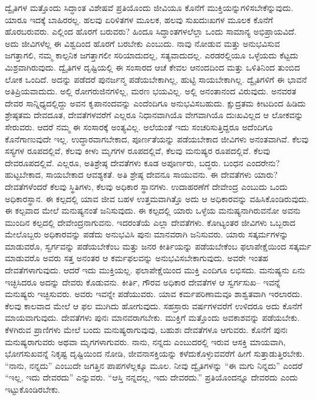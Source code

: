 ದ್ವೈತಿಗಳ ಮತ್ತೊಂದು ಸಿದ್ಧಾಂತ ವಿಶೇಷವೆ ಪ್ರತಿಯೊಂದು ಜೀವಿಯೂ ಕೊನೆಗೆ ಮುಕ್ತಿಯನ್ನುಗಳಿಸಬೇಕೆನ್ನುವುದು. ಯಾರೂ ಇದಕ್ಕೆ ಬಾಹಿರರಲ್ಲ. ಹಲವು ಏರಿಳಿತಗಳ ಮೂಲಕ, ಹಲವು ಸುಖದುಃಖಗಳ ಮೂಲಕ ಕೊನೆಗೆ ಹೊರಬರುವರು. ಎಲ್ಲಿಂದ ಹೊರಗೆ ಬರುವರು? ಹಿಂದೂ ಸಿದ್ಧಾಂತಗಳಲೆಲ್ಲಾ ಒಂದು ಸಾಮಾನ್ಯ ಅಭಿಪ್ರಾಯವಿದೆ. ಅದು ಜೀವಿಗಳೆಲ್ಲ ಈ ವಿಶ್ವದಿಂದ ಹೊರಗೆ ಬರಬೇಕು ಎಂಬುದು. ನಾವು ನೋಡುವ ಮತ್ತು ಅನುಭವಿಸುವ ಜಗತ್ತಾಗಲಿ, ನಮ್ಮ ಕಾಲ್ಪನಿಕ ಜಗತ್ತಾಗಲೀ ಸರಿಯಾದುದಲ್ಲ, ಸತ್ಯವಾದುದಲ್ಲ. ಎರಡರಲ್ಲಿಯೂ ಒಳ್ಳೆಯದು ಕೆಟ್ಟದು ಮಿಶ್ರವಾಗಿರುವುದು. ದ್ವೈತಿಗಳ ದೃಷ್ಟಿಯಲ್ಲಿ ಈ ಸಂಸಾರದ ಆಚೆ ಕೇವಲ ಆನಂದದಿಂದ ಮತ್ತು ಒಳಿತಿನಿಂದ ತುಂಬಿದ ಲೋಕ ಒಂದಿದೆ. ಅದನ್ನು ಪಡೆದರೆ ಪುನರ್ಜನ್ಮ ಪಡೆಯಬೇಕಾಗಿಲ್ಲ, ಹುಟ್ಟಿ ಸಾಯಬೇಕಾಗಿಲ್ಲ. ದ್ವೈತಿಗಳಿಗೆ ಈ ಭಾವನೆ ಅತಿಪ್ರಿಯವಾದುದು. ಅಲ್ಲಿ ರೋಗರುಜಿನಗಳಿಲ್ಲ, ಮರಣ ಭಯವಿಲ್ಲ. ಅಲ್ಲಿ ಅನಂತಾನಂದ ವಿರುವುದು. ಅನವರತ ದೇವರ ಸಾನ್ನಿಧ್ಯದಲ್ಲಿದ್ದು ಅವನ ಕೃಪಾನಂದವನ್ನು ಎಂದೆಂದಿಗೂ ಅನುಭವಿಸಬಹುದು. ಕ್ಷುದ್ರತಮ ಕೀಟದಿಂದ ಹಿಡಿದು ಶ್ರೇಷ್ಠತಮ ದೇವದೂತ, ದೇವತೆಗಳವರೆಗೆ ಎಲ್ಲರೂ ನಿಧಾನವಾಗಿಯೊ ವೇಗವಾಗಿಯೊ ದುಃಖವಿಲ್ಲದ ಆ ಲೋಕವನ್ನು ಸೇರುವರು. ಆದರೆ ನಮ್ಮ ಈ ಸಂಸಾರಕ್ಕೆ ಅಂತ್ಯವಿಲ್ಲ. ಅಲೆಯಂತೆ ಇದು ಸಂಚರಿಸುತ್ತಿದ್ದರೂ ಅದೆಂದಿಗೂ ಕೊನೆಗಾಣುವುದೇ ಇಲ್ಲ. ಉದ್ಧಾರವಾಗಬೇಕಾದ, ಪೂರ್ಣತೆಯನ್ನು ಪಡೆಯಬೇಕಾದ ಜೀವಿಗಳು ಅನಂತವಾಗಿವೆ. ಕೆಲವು ಸಸ್ಯಗಳ ರೂಪದಲ್ಲಿವೆ, ಕೆಲವು ಕೀಳು ಮೃಗಗಳ ರೂಪದಲ್ಲಿವೆ, ಕೆಲವು ಮನುಷ್ಯರ ರೂಪದಲ್ಲಿವೆ. ಕೆಲವು ದೇವರೂಪದಲ್ಲಿವೆ. ಎಲ್ಲರೂ, ಅತಿಶ್ರೇಷ್ಠ ದೇವತೆಗಳು ಕೂಡ ಅಪೂರ್ಣರು, ಬದ್ಧರು. ಬಂಧನ ಎಂದರೇನು? ಹುಟ್ಟಬೇಕಾದ, ಸಾಯಬೇಕಾದ ಆವಶ್ಯಕತೆ. ಅತಿ ಶ್ರೇಷ್ಠ ದೇವನೂ ಸಾಯುವನು. ಈ ದೇವತೆಗಳು ಯಾರು? ದೇವತೆಗಳೆಂದರೆ ಕೆಲವು ಸ್ಥಿತಿಗಳು, ಕೆಲವು ಅಧಿಕಾರ ಸ್ಥಾನಗಳು. ಉದಾಹರಣೆಗೆ ದೇವೇಂದ್ರ ಎಂಬುದು ಒಂದು ಅಧಿಕಾರಸ್ಥಾನ. ಈ ಕಲ್ಪದಲ್ಲಿ ಯಾವ ಜೀವ ಬಹಳ ಉತ್ತಮವಾಗಿತ್ತೊ ಅದು ಆ ಅಧಿಕಾರವನ್ನು ವಹಿಸಿಕೊಂಡಿರುವುದು. ಈ ಕಲ್ಪವಾದ ಮೇಲೆ ಮನುಷ್ಯನಂತೆ ಜನಿಸುವುದು. ಈ ಕಲ್ಪದಲ್ಲಿ ಯಾರು ಒಳ್ಳೆಯ ಮನುಷ್ಯನಾಗಿರುವನೋ ಅವನು ಮುಂದಿನ ಕಲ್ಪದಲ್ಲಿ ದೇವೇಂದ್ರನಾಗುವನು. ಇದರಂತೆಯೆ ಎಲ್ಲಾ ದೇವತೆಗಳು. ಕೋಟ್ಯಂತರ ಜೀವಿಗಳು ಒಬ್ಬರಾದ ಮೇಲೊಬ್ಬರು ಅಧಿಕಾರವನ್ನು ಪಡೆದು ಅನುಭವಿಸಿ ಪುನಃ ಮಾನವರಾಗಿ ಜನಿಸುವರು. ಯಾರು ಸತ್ಕರ್ಮಗಳನ್ನು ಮಾಡುವರೊ, ಸ್ವರ್ಗವನ್ನು ಪಡೆಯಬೇಕೆಂಬ ಮತ್ತು ಜನರ ಕೀರ್ತಿಯನ್ನು ಪಡೆಯಬೇಕೆಂಬ ಫಲಾಪೇಕ್ಷೆಯಿಂದ ಸತ್ಕರ್ಮ ಮಾಡುವರೊ ಅವರು ಸತ್ತ ಅನಂತರ ಆ ಕರ್ಮಫಲವನ್ನು ಅನುಭವಿಸಬೇಕಾಗುವುದು. ಅವರೇ ಇಂತಹ ದೇವತೆಗಳಾಗುವುದು. ಆದರೆ ಇದು ಮುಕ್ತಿಯಲ್ಲ. ಫಲಾಪೇಕ್ಷೆಯಿಂದ ಮುಕ್ತಿ ಎಂದಿಗೂ ಲಭಿಸದು. ಮನುಷ್ಯನು ಏನು ಇಚ್ಛಿಸಿದರೂ ಅದನ್ನು ದೇವರು ಕೊಡುವನು. ಕೀರ್ತಿ, ಗೌರವ ಅಧಿಕಾರ ದೇವತೆಗಳ ಆ ಸ್ವರ್ಗಸುಖ– ಇವನ್ನೆ ಮನುಷ್ಯರು ಇಚ್ಛಿಸುವರು. ಅವರು ಇವನ್ನೇ ಪಡೆಯುವರು. ಯಾವ ಕರ್ಮಪರಿಣಾಮವೂ ಶಾಶ್ವತವಾಗಿ ಇರಲಾರದು. ಕೆಲವು ಕಾಲವಾದ ಮೇಲೆ ಆ ಫಲ ಮುಗಿದು ಹೋಗುವುದು. ಸಹಸ್ರಾರು ವರ್ಷಗಳವರೆಗೆ ಉಳಿದರೂ ಅದು ಕೊನೆಗೆ ಮಾಯವಾಗುವುದು. ದೇವತೆಗಳು ಪುನಃ ಮಾನವರಾಗಬೇಕು. ಮುಕ್ತಿಗೆ ಮತ್ತೊಂದು ಅವಕಾಶವನ್ನು ಪಡೆಯಬೇಕು. ಕೆಳಗಿರುವ ಪ್ರಾಣಿಗಳು ಮೇಲೆ ಬಂದು ಮನುಷ್ಯರಾಗುವುವು, ಬಹುಶಃ ದೇವತೆಗಳೂ ಆಗುವರು. ಕೊನೆಗೆ ಪುನಃ ಮನುಷ್ಯರಾಗುವರು ಅಥವಾ ಮೃಗಗಳಾಗುವರು. ನಾನು, ನನ್ನದು ಎಂಬುದರಲ್ಲಿ ಇರುವ ಆಸಕ್ತಿ ಮಾಯವಾಗಿ, ಭೋಗಸುಖವನ್ನೆ ನಿಕೃಷ್ಟ ದೃಷ್ಟಿಯಿಂದ ನೋಡಿ, ಜೀವನಾಸಕ್ತಿಯನ್ನು ಕಳೆದುಕೊಳ್ಳುವವರೆಗೆ ಹೀಗೆ ಸುತ್ತಾಡುತ್ತಿರಬೇಕು. “ನಾನು, ನನ್ನದು” ಎಂಬುದೇ ಜಗತ್ತಿನ ಪಾಪಗಳೆಲ್ಲಕ್ಕೂ ಮೂಲ. ನೀವು ದ್ವೈತಿಗಳನ್ನು “ಈ ಮಗು ನಿನ್ನದು” ಎಂದರೆ “ಇಲ್ಲ, ಇದು ದೇವರದು” ಎನ್ನುವರು. “ಆಸ್ತಿ ನನ್ನದಲ್ಲ, ಇದು ದೇವರದು.” ಪ್ರತಿಯೊಂದನ್ನೂ ದೇವರದು ಎಂದು ಇಟ್ಟುಕೊಂಡಿರಬೇಕು.


